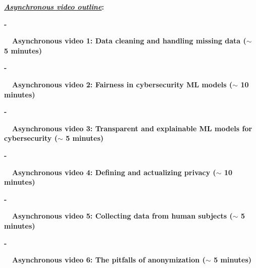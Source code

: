 \documentclass[12pt]{article}
\renewcommand{\_}{\kern-1.5pt\textunderscore\kern-1.5pt}
\begin{document}
\vspace{\baselineskip}
\textbf{\textit{\uline{Asynchronous video outline}}:}\par

\begin{adjustwidth}{0.5in}{0.0in}
\textbf{-}{\fontsize{7pt}{8.4pt}\selectfont \textbf{\ \  \tab Asynchronous video 1: Data cleaning and handling missing data ($ \sim $ 5 minutes)}\par}\par

\end{adjustwidth}

\begin{adjustwidth}{0.5in}{0.0in}
\textbf{-}{\fontsize{7pt}{8.4pt}\selectfont \textbf{\ \  \tab Asynchronous video 2: Fairness in cybersecurity ML models ($ \sim $ 10 minutes)}\par}\par

\end{adjustwidth}

\begin{adjustwidth}{0.5in}{0.0in}
\textbf{-}{\fontsize{7pt}{8.4pt}\selectfont \textbf{\ \  \tab Asynchronous video 3: Transparent and explainable ML models for cybersecurity ($ \sim $ 5 minutes)}\par}\par

\end{adjustwidth}

\begin{adjustwidth}{0.5in}{0.0in}
\textbf{-}{\fontsize{7pt}{8.4pt}\selectfont \textbf{\ \  \tab Asynchronous video 4: Defining and actualizing privacy ($ \sim $ 10 minutes)}\par}\par

\end{adjustwidth}

\begin{adjustwidth}{0.5in}{0.0in}
\textbf{-}{\fontsize{7pt}{8.4pt}\selectfont \textbf{\ \  \tab Asynchronous video 5: Collecting data from human subjects ($ \sim $ 5 minutes)}\par}\par

\end{adjustwidth}

\begin{adjustwidth}{0.5in}{0.0in}
\textbf{-}{\fontsize{7pt}{8.4pt}\selectfont \textbf{\ \  \tab Asynchronous video 6: The pitfalls of anonymization ($ \sim $ 5 minutes)}\par}\par

\end{adjustwidth}
\end{document}
